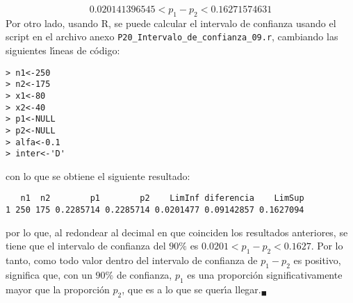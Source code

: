 \begin{solucion}
\begin{equation*}
  0.020141396545 < p_1 - p_2 < 0.16271574631
 \end{equation*}
 Por otro lado, usando R, se puede calcular el intervalo de confianza usando el script en el archivo anexo \texttt{P20\_Intervalo\_de\_confianza\_09.r}, cambiando las siguientes l\'{\i}neas de c\'odigo:
 \begin{verbatim}
> n1<-250
> n2<-175
> x1<-80
> x2<-40
> p1<-NULL
> p2<-NULL
> alfa<-0.1
> inter<-'D'
 \end{verbatim}
 \vspace{-0.5cm}
 con lo que se obtiene el siguiente resultado:
 \begin{verbatim}
   n1  n2        p1        p2    LimInf diferencia    LimSup
1 250 175 0.2285714 0.2285714 0.0201477 0.09142857 0.1627094
 \end{verbatim}
 \vspace{-0.5cm}
 por lo que, al redondear al decimal en que coinciden los resultados anteriores, se tiene que el intervalo de confianza del $90\%$ es $0.0201 < p_1-p_2 < 0.1627$. Por lo tanto, como todo valor dentro del intervalo de confianza de $p_1 - p_2$ es positivo, significa que, con un $90\%$ de confianza, $p_1$ es una proporci\'on significativamente mayor que la proporci\'on $p_2$, que es a lo que se quer\'{\i}a llegar.${}_{\blacksquare}$
\end{solucion}
